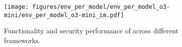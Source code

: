 \begin{figure*}
    \centering
    \texttt{[image: figures/env\_per\_model/env\_per\_model\_o3-mini/env\_per\_model\_o3-mini\_im.pdf]}
    \vspace{-1em}
    \caption{Functionality and security performance of \openaiothree{}  across different frameworks.}
    \label{fig:env_per_model_o3}
    \vspace{-1em}
\end{figure*}
